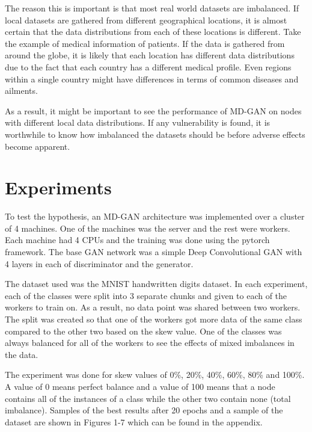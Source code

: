 \documentclass[11pt]{article}       %
\begin{document}
The reason this is important is that most real world datasets are imbalanced. If local datasets are gathered from different geographical locations, it is almost certain that the data distributions from each of these locations is different. Take the example of medical information of patients. If the data is gathered from around the globe, it is likely that each location has different data distributions due to the fact that each country has a different medical profile. Even regions within a single country might have differences in terms of common diseases and ailments.

As a result, it might be important to see the performance of MD-GAN on nodes with different local data distributions. If any vulnerability is found, it is worthwhile to know how imbalanced the datasets should be before adverse effects become apparent.

\section{Experiments} \label{expEval}

To test the hypothesis, an MD-GAN architecture was implemented over a cluster of 4 machines. One of the machines was the server and the rest were workers. Each machine had 4 CPUs and the training was done using the pytorch framework. The base GAN network was a simple Deep Convolutional GAN with 4 layers in each of discriminator and the generator. 

The dataset used was the MNIST handwritten digits dataset. In each experiment, each of the classes were split into 3 separate chunks and given to each of the workers to train on. As a result, no data point was shared between two workers. The split was created so that one of the workers got more data of the same class compared to the other two based on the skew value. One of the classes was always balanced for all of the workers to see the effects of mixed imbalances in the data.

The experiment was done for skew values of 0\%, 20\%, 40\%, 60\%, 80\% and 100\%. A value of 0 means perfect balance and a value of 100 means that a node contains all of the instances of a class while the other two contain none (total imbalance). Samples of the best results after 20 epochs and a sample of the dataset are shown in Figures 1-7 which can be found in the appendix.
\end{document}
